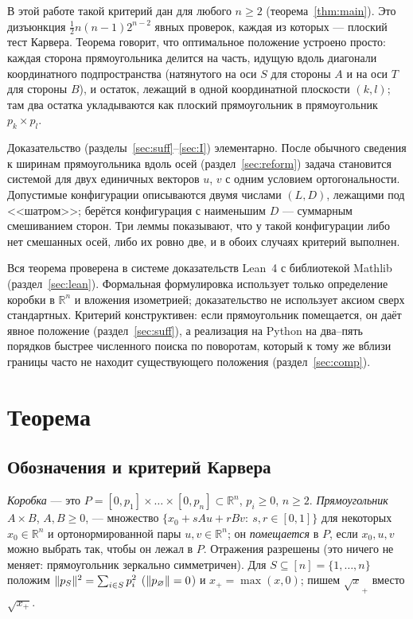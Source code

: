 \documentclass[11pt]{article}
\theoremstyle{definition}
\theoremstyle{remark}
\newcommand{\R}{\mathbb{R}}
\DeclarePairedDelimiter{\norm}{\lVert}{\rVert}
\begin{document}
В этой работе такой критерий дан для любого $n\ge2$ (теорема~\ref{thm:main}). Это дизъюнкция
$\tfrac12 n(n-1)2^{n-2}$ явных проверок, каждая из которых --- плоский тест Карвера. Теорема говорит, что
оптимальное положение устроено просто: каждая сторона прямоугольника делится на часть, идущую вдоль
диагонали координатного подпространства (натянутого на оси $S$ для стороны $A$ и на оси $T$ для
стороны $B$), и остаток, лежащий в одной координатной плоскости $(k,l)$; там два остатка укладываются как
плоский прямоугольник в прямоугольник $p_k\times p_l$.

Доказательство (разделы~\ref{sec:suff}--\ref{sec:I}) элементарно. После обычного сведения к ширинам
прямоугольника вдоль осей (раздел~\ref{sec:reform}) задача становится системой для двух единичных векторов
$u$, $v$ с одним условием ортогональности. Допустимые конфигурации описываются двумя числами $(L,D)$,
лежащими под <<шатром>>; берётся конфигурация с наименьшим $D$ --- суммарным смешиванием сторон. Три
леммы показывают, что у такой конфигурации либо нет смешанных осей, либо их ровно две, и в обоих
случаях критерий выполнен.

Вся теорема проверена в системе доказательств Lean~4 с библиотекой Mathlib (раздел~\ref{sec:lean}).
Формальная формулировка использует только определение коробки в $\R^n$ и вложения изометрией;
доказательство не использует аксиом сверх стандартных. Критерий конструктивен: если прямоугольник
помещается, он даёт явное положение (раздел~\ref{sec:suff}), а реализация на Python на два--пять порядков
быстрее численного поиска по поворотам, который к тому же вблизи границы часто не находит существующего
положения (раздел~\ref{sec:comp}).

\section{Теорема}\label{sec:thm}

\subsection{Обозначения и критерий Карвера}

\emph{Коробка} --- это $P=[0,p_1]\times\dots\times[0,p_n]\subset\R^n$, $p_i\ge0$, $n\ge2$.
\emph{Прямоугольник} $A\times B$, $A,B\ge0$, --- множество $\{x_0+sAu+rBv:\ s,r\in[0,1]\}$ для некоторых
$x_0\in\R^n$ и ортонормированной пары $u,v\in\R^n$; он \emph{помещается} в $P$, если $x_0,u,v$ можно выбрать
так, чтобы он лежал в $P$. Отражения разрешены (это ничего не меняет: прямоугольник зеркально
симметричен). Для $S\subseteq[n]=\{1,\dots,n\}$ положим $\norm{p_S}^2=\sum_{i\in S}p_i^2$
($\norm{p_\varnothing}=0$) и $x_+=\max(x,0)$; пишем $\sqrt{x}_+$ вместо $\sqrt{x_+}$.
\end{document}

